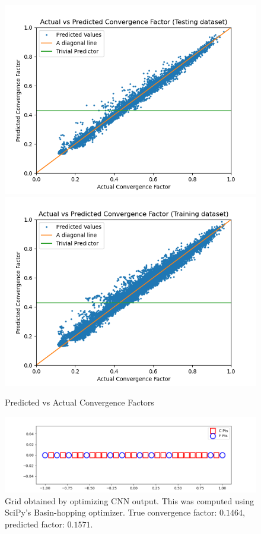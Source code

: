 \begin{figure}[h]
  \centering
  \includegraphics[scale=0.7]{figures/jacobi-conv/conv_test_pred.png}
  \includegraphics[scale=0.7]{figures/jacobi-conv/conv_train_pred.png}
  \caption{Predicted vs Actual Convergence Factors}
  \label{fig:conv_preds}
\end{figure}

\begin{figure}[h]
  \centering
  \includegraphics[scale=0.7]{figures/jacobi-conv/conv_opt_grid.png}
  \caption{Grid obtained by optimizing CNN output.  This was computed using SciPy's Basin-hopping optimizer.  True convergence factor: $0.1464$, predicted factor: $0.1571$.}
  \label{fig:optimized_grid}
\end{figure}


